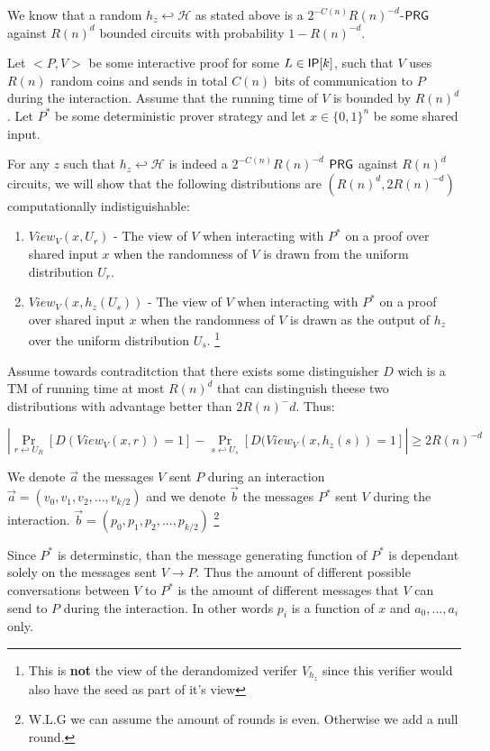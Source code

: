 \documentclass[11]{article}
\newenvironment{proof}[1][Proof]{\begin{trivlist}
\item[\hskip \labelsep {\bfseries #1}]}{\end{trivlist}}
\begin{document}
\begin{proof}

We know that a random $h_z \hookleftarrow \mathcal{H}$ as stated above is a $2^{-C(n)}R(n)^{-d}$-$\mathsf{PRG}$ against $R(n)^d$ bounded circuits with probability $1 - R(n)^{-d}$.

Let $<P,V>$ be some interactive proof for some $L \in \mathsf{IP}[k]$, such that $V$ uses $R(n)$ random coins and sends in total $C(n)$ bits of communication to $P$ during the interaction. Assume that the running time of $V$ is bounded by $R(n)^d$. Let $P^*$ be some deterministic prover strategy and let $x \in \{0,1\}^n$ be some shared input.

For any $z$ such that $h_z \hookleftarrow \mathcal{H}$ is indeed a $2^{-C(n)}R(n)^{-d}$ $\mathsf{PRG}$ against $R(n)^d$ circuits, we will show that the following distributions are $(R(n)^d, 2R(n)^{-d})$ computationally indistiguishable:

\begin{enumerate}
 \item $View_V(x,U_r)$ - The view of $V$ when interacting with $P^*$ on a proof over shared input $x$ when the randomness of $V$ is drawn from the uniform distribution $U_r$.
 
 \item $View_V(x, h_z(U_s))$ - The view of $V$ when interacting with $P^*$ on a proof over shared input $x$ when the randomness of $V$ is drawn as the output of $h_z$ over the uniform distribution $U_s$. \footnote{This is \textbf{not} the view of the derandomized verifer $V_{h_z}$ since this verifier would also have the seed as part of it's view}
\end{enumerate}

Assume towards contraditction that there exists some distinguisher $D$ wich is a TM of running time at most $R(n)^d$ that can distinguish theese two distributions with advantage better than $2R(n)^-d$. Thus:

$$ |\Pr_{r \hookleftarrow U_R}[D(View_V(x, r)) = 1] - \Pr_{s \hookleftarrow U_s}[D(View_V(x, h_z(s)) = 1]| \geq 2R(n)^{-d}$$

We denote $\vec{a}$ the messages $V$ sent $P$ during an interaction $\vec{a} = (v_0, v_1, v_2,..., v_{k/2})$ and we denote $\vec{b}$ the messages $P^*$ sent $V$ during the interaction. $\vec{b} = (p_0, p_1, p_2,..., p_{k/2})$ \footnote{W.L.G we can assume the amount of rounds is even. Otherwise we add a null round.}

Since $P^*$ is determinstic, than the message generating function of $P^*$ is dependant solely on the messages sent $V \to P$. Thus the amount of different possible conversations between $V$ to $P^*$ is the amount of different messages that $V$ can send to $P$ during the interaction. In other words $p_i$ is a function of $x$ and $a_0,...,a_i$ only.


\end{proof}
\end{document}

